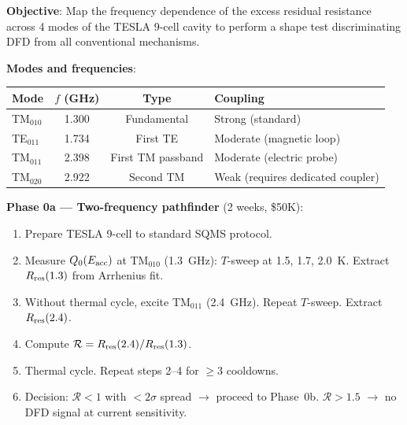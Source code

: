 \documentclass[11pt]{article}
\theoremstyle{definition}
\theoremstyle{remark}
\begin{document}
\begin{tcolorbox}[colback=yellow!5!white, colframe=orange!60!black,
  title=\textbf{MULTI-FREQUENCY Q-RATIO MEASUREMENT PROTOCOL},
  breakable]

\textbf{Objective}: Map the frequency dependence of the excess residual
resistance across 4 modes of the TESLA 9-cell cavity to perform a shape
test discriminating DFD from all conventional mechanisms.

\textbf{Modes and frequencies}:
\begin{center}
\begin{tabular}{@{}lccl@{}}
\toprule
Mode & $f$ (GHz) & Type & Coupling \\
\midrule
TM$_{010}$ & 1.300 & Fundamental & Strong (standard) \\
TE$_{011}$ & 1.734 & First TE & Moderate (magnetic loop) \\
TM$_{011}$ & 2.398 & First TM passband & Moderate (electric probe) \\
TM$_{020}$ & 2.922 & Second TM & Weak (requires dedicated coupler) \\
\bottomrule
\end{tabular}
\end{center}

\textbf{Phase 0a --- Two-frequency pathfinder} (2 weeks, \$50K):
\begin{enumerate}[nosep]
\item Prepare TESLA 9-cell to standard SQMS protocol.
\item Measure $Q_0(E_{\rm acc})$ at TM$_{010}$ (1.3~GHz): $T$-sweep
  at 1.5, 1.7, 2.0~K. Extract $R_{\rm res}(1.3)$ from Arrhenius fit.
\item Without thermal cycle, excite TM$_{011}$ (2.4~GHz). Repeat
  $T$-sweep. Extract $R_{\rm res}(2.4)$.
\item Compute $\mathcal{R} = R_{\rm res}(2.4)/R_{\rm res}(1.3)$.
\item Thermal cycle. Repeat steps 2--4 for $\geq 3$ cooldowns.
\item Decision: $\mathcal{R} < 1$ with $< 2\sigma$ spread $\to$ proceed
  to Phase~0b. $\mathcal{R} > 1.5$ $\to$ no DFD signal at current
  sensitivity.
\end{enumerate}


\end{tcolorbox}
\end{document}
